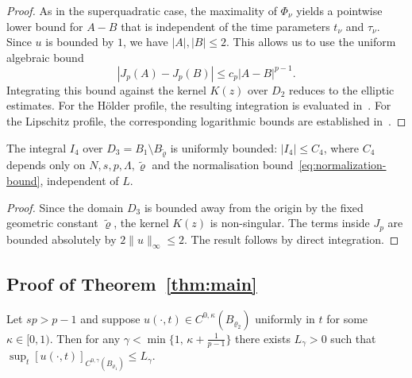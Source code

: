 \documentclass[11pt, a4paper, twoside]{article}
\theoremstyle{definition}
\theoremstyle{remark}
\begin{document}
\begin{proof}
As in the superquadratic case, the maximality of $\Phi_\nu$ yields a pointwise lower bound for $A-B$ that is independent of the time parameters $t_\nu$ and $\tau_\nu$. Since $u$ is bounded by $1$, we have $|A|, |B| \le 2$. This allows us to use the uniform algebraic bound
\[
  |J_p(A)-J_p(B)| \le c_p|A-B|^{p-1}.
\]
Integrating this bound against the kernel $K(z)$ over $D_2$ reduces to the elliptic estimates. For the H\"{o}lder profile, the resulting integration is evaluated in~\cite[Section~4.2]{BiswasTopp2025}. For the Lipschitz profile, the corresponding logarithmic bounds are established in~\cite[Proof of Theorem~2.1]{BiswasTopp2025}.
\end{proof}

\begin{lemma}
\label{lem:parabolic-I4}
The integral $I_4$ over $D_3 = B_1 \setminus B_{\tilde\varrho}$ is uniformly bounded: $|I_4| \le C_4$, where $C_4$ depends only on $N, s, p, \Lambda, \tilde\varrho$ and the normalisation bound~\eqref{eq:normalization-bound}, independent of $L$.
\end{lemma}
\begin{proof}
Since the domain $D_3$ is bounded away from the origin by the fixed geometric constant $\tilde\varrho$, the kernel $K(z)$ is non-singular. The terms inside $J_p$ are bounded absolutely by $2\|u\|_\infty \le 2$. The result follows by direct integration.
\end{proof}
\subsection{Proof of Theorem~\ref{thm:main}}
\label{sec:main-proofs}

\begin{proposition}
\label{prop:parabolic-holder-bootstrap}
Let $sp > p-1$ and suppose $u(\cdot,t) \in C^{0,\kappa}(B_{\varrho_2})$ uniformly in $t$ for some
$\kappa \in [0,1)$. Then for any $\gamma < \min\!\bigl\{1,\,\kappa+\tfrac{1}{p-1}\bigr\}$ there exists
$L_\gamma > 0$ such that $\sup_t [u(\cdot,t)]_{C^{0,\gamma}(B_{\varrho_1})} \le L_\gamma$.
\end{proposition}
\end{document}
